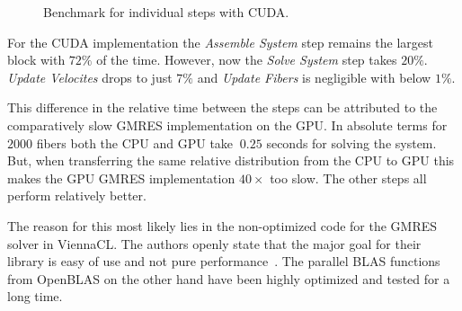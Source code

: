 \begin{figure}[!htbp]
  \centering
  \caption{Benchmark for individual steps with CUDA.}
  \label{fig:bench_cuda_steps}
\end{figure}

For the CUDA implementation the \emph{Assemble System} step remains the largest block with $72\%$ of the time. However, now the \emph{Solve System} step takes $20\%$. \emph{Update Velocites} drops to just $7\%$ and \emph{Update Fibers} is negligible with below $1\%$.

This difference in the relative time between the steps can be attributed to the comparatively slow GMRES implementation on the GPU. In absolute terms for $2000$ fibers both the CPU and GPU take $~0.25$ seconds for solving the system. But, when transferring the same relative distribution from the CPU to GPU this makes the GPU GMRES implementation $40×$ too slow. The other steps all perform relatively better.

The reason for this most likely lies in the non-optimized code for the GMRES solver in ViennaCL. The authors openly state that the major goal for their library is easy of use and not pure performance~\cite{ViennaCLRupp2010}. The parallel BLAS functions from OpenBLAS on the other hand have been highly optimized and tested for a long time.

